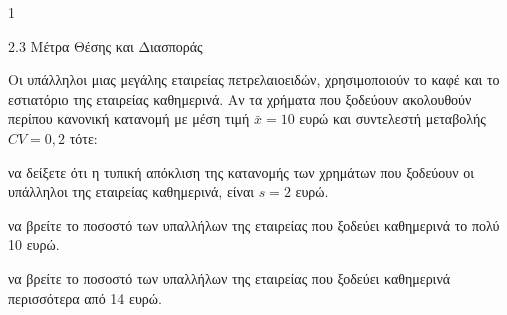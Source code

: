 \begin{ylh}{1}
    \item 2.3 Μέτρα Θέσης και Διασποράς
\end{ylh}
Οι υπάλληλοι μιας μεγάλης εταιρείας πετρελαιοειδών, χρησιμοποιούν το καφέ και το εστιατόριο της εταιρείας καθημερινά. Αν τα χρήματα που ξοδεύουν ακολουθούν περίπου κανονική κατανομή με μέση τιμή $\bar{x} = 10$ ευρώ και συντελεστή μεταβολής $CV = 0,2$ τότε:
\begin{alist}
    \item να δείξετε ότι η τυπική απόκλιση της κατανομής των χρημάτων που ξοδεύουν οι υπάλληλοι της εταιρείας καθημερινά, είναι $s = 2$ ευρώ. 
    \item 
    \begin{rlist}
        \item να βρείτε το ποσοστό των υπαλλήλων της εταιρείας που ξοδεύει καθημερινά το πολύ 10 ευρώ. 
        \item να βρείτε το ποσοστό των υπαλλήλων της εταιρείας που ξοδεύει καθημερινά περισσότερα από 14 ευρώ. 
    \end{rlist}
\end{alist}

